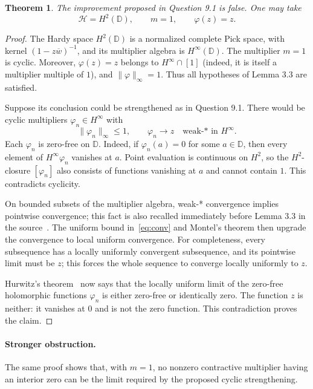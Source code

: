 \documentclass[11pt]{article}
\newtheorem{theorem}{Theorem}
\begin{document}
\begin{theorem}\label{thm:counter}
The improvement proposed in Question 9.1 is false.  One may take
\[
 \mathcal H=H^2(\mathbb D),\qquad m=1,\qquad\varphi(z)=z.
\]
\end{theorem}

\begin{proof}
The Hardy space $H^2(\mathbb D)$ is a normalized complete Pick space, with
kernel $(1-z\overline w)^{-1}$, and its multiplier algebra is
$H^\infty(\mathbb D)$.  The multiplier $m=1$ is cyclic.  Moreover,
$\varphi(z)=z$ belongs to $H^\infty\cap[1]$ (indeed, it is itself a
multiplier multiple of $1$), and $\|\varphi\|_\infty=1$.  Thus all hypotheses
of Lemma 3.3 are satisfied.

Suppose its conclusion could be strengthened as in Question 9.1.  There
would be cyclic multipliers $\varphi_n\in H^\infty$ with
\begin{equation}\label{eq:conv}
 \|\varphi_n\|_\infty\leq1,
 \qquad \varphi_n\longrightarrow z\quad\text{weak-* in }H^\infty.
\end{equation}
Each $\varphi_n$ is zero-free on $\mathbb D$.  Indeed, if
$\varphi_n(a)=0$ for some $a\in\mathbb D$, then every element of
$H^\infty\varphi_n$ vanishes at $a$.  Point evaluation is continuous on
$H^2$, so the $H^2$-closure $[\varphi_n]$ also consists of functions
vanishing at $a$ and cannot contain $1$.  This contradicts cyclicity.

On bounded subsets of the multiplier algebra, weak-* convergence implies
pointwise convergence; this fact is also recalled immediately before Lemma
3.3 in the source~\cite{AHMR}.  The uniform bound in~\eqref{eq:conv} and
Montel's theorem then upgrade the convergence to local uniform convergence.
For completeness, every subsequence has a locally uniformly convergent
subsequence, and its pointwise limit must be $z$; this forces the whole
sequence to converge locally uniformly to $z$.

Hurwitz's theorem~\cite[Theorem 10.28]{Rudin} now says that the locally
uniform limit of the zero-free holomorphic functions $\varphi_n$ is either
zero-free or identically zero.  The function $z$ is neither: it vanishes at
$0$ and is not the zero function.  This contradiction proves the claim.
\end{proof}

\paragraph{Stronger obstruction.}
The same proof shows that, with $m=1$, no nonzero contractive multiplier
having an interior zero can be the limit required by the proposed cyclic
strengthening.
\end{document}
